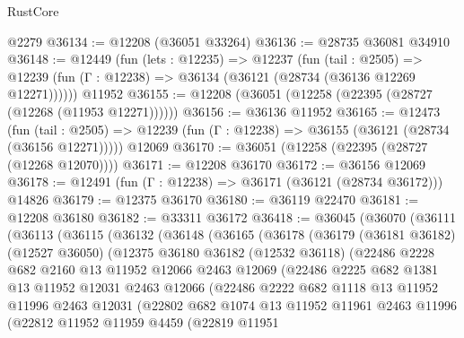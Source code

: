 \begin{lexlean}{RustCore}
\begin{coremodule}
    @2279
@36134 := @12208 (@36051 @33264)
@36136 := @28735 @36081 @34910
@36148 := @12449
    (fun (lets : @12235) =>
    @12237
      (fun (tail : @2505) =>
      @12239 (fun (Γ : @12238) => @36134 (@36121 (@28734 (@36136 @12269 @12271))))))
    @11952
@36155 := @12208 (@36051 (@12258 (@22395 (@28727 (@12268 (@11953 @12271))))))
@36156 := @36136 @11952
@36165 := @12473
    (fun (tail : @2505) => @12239 (fun (Γ : @12238) => @36155 (@36121 (@28734 (@36156 @12271)))))
    @12069
@36170 := @36051 (@12258 (@22395 (@28727 (@12268 @12070))))
@36171 := @12208 @36170
@36172 := @36156 @12069
@36178 := @12491 (fun (Γ : @12238) => @36171 (@36121 (@28734 @36172))) @14826
@36179 := @12375 @36170
@36180 := @36119 @22470
@36181 := @12208 @36180
@36182 := @33311 @36172
@36418 := @36045
    (@36070
      (@36111
        (@36113
          (@36115
            (@36132
              (@36148
                (@36165
                  (@36178
                    (@36179
                      (@36181 @36182)
                      (@12527 @36050)
                      (@12375
                        @36180
                        @36182
                        (@12532 @36118)
                        (@22486
                          @2228
                          @682
                          @2160
                          @13
                          @11952
                          @12066
                          @2463
                          @12069
                          (@22486
                            @2225
                            @682
                            @1381
                            @13
                            @11952
                            @12031
                            @2463
                            @12066
                            (@22486
                              @2222
                              @682
                              @1118
                              @13
                              @11952
                              @11996
                              @2463
                              @12031
                              (@22802
                                @682
                                @1074
                                @13
                                @11952
                                @11961
                                @2463
                                @11996
                                (@22812
                                  @11952
                                  @11959
                                  @4459
                                  (@22819
                                    @11951

\end{coremodule}
\end{lexlean}

